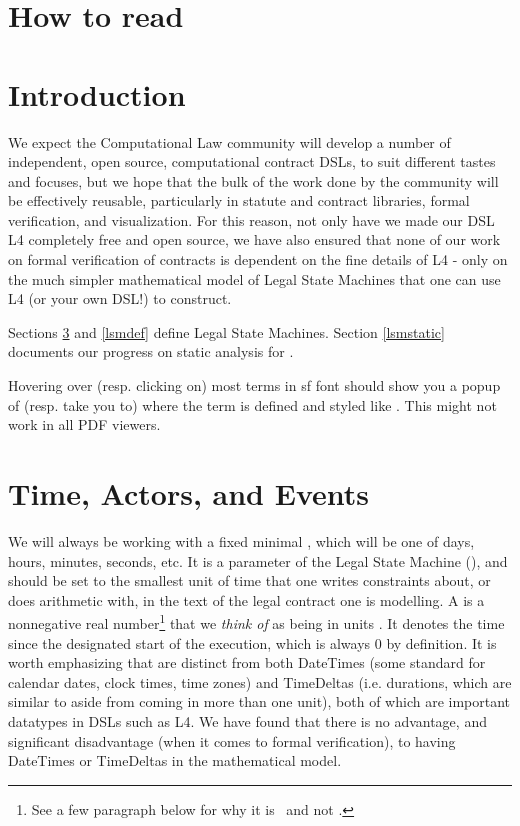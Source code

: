\documentclass[12pt]{article}
\newcommand{\term}[1]{\EM{\textsf{\hyperref[#1]{#1}}}\xspace}
\newcommand{\termz}[2]{\EM{\textsf{\hyperref[#1]{#2}}}\xspace}
\newcommand{\lsmslong}{Legal State Machines\xspace}
\newcommand{\lsm}{\texorpdfstring{\termz{lsm}{LSM}}{LSM}}
\newcommand{\lsms}{\texorpdfstring{\termz{lsm}{LSMs}}{LSMs}}
\newcommand{\timeunit}{\term{timeunit}}
\newcommand{\timestamps}{\termz{timestamp}{timestamps}}
\newcommand{\TS}{\EM{\mathbb{\hyperref[TS]{T}}}\xsapce}
\begin{document}
\section{How to read}

\section{Introduction}

We expect the Computational Law community will develop a number of independent, open source, computational contract DSLs, to suit different tastes and focuses, but we hope that the bulk of the work done by the community will be effectively reusable, particularly in statute and contract libraries, formal verification, and visualization. For this reason, not only have we made our DSL L4 completely free and open source, we have also ensured that none of our work on formal verification of contracts is dependent on the fine details of L4 - only on the much simpler mathematical model of \lsmslong that one can use L4 (or your own DSL!) to construct.

Sections \ref{basics} and \ref{lsmdef} define \lsmslong. Section \ref{lsmstatic} documents our progress on static analysis for \lsms.

Hovering over (resp. clicking on) most terms in \textsf{{sf font}} should show you a popup of (resp. take you to)  where the term is defined and styled like . This might not work in all PDF viewers.


\section{Time, Actors, and Events} \label{basics}
We will always be working with a fixed minimal , which will be one of days, hours, minutes, seconds, etc. It is a parameter of the Legal State Machine (\lsm), and should be set to the smallest unit of time that one writes constraints about, or does arithmetic with, in the text of the legal contract one is modelling.  A  is  a nonnegative real number\footnote{See a few paragraph below for why it is \RR\, and not \NN.} that we \textit{think of} as being in units \timeunit. It denotes the time since the designated start of the \lsm execution, which is always 0 by definition.
It is worth emphasizing that \timestamps are distinct from both DateTimes (some standard for calendar dates, clock times, time zones) and TimeDeltas (i.e. durations, which are similar to \timeunit aside from coming in more than one unit), both of which are important datatypes in DSLs such as L4. We have found that there is no advantage, and significant disadvantage (when it comes to formal verification), to having DateTimes or TimeDeltas in the mathematical model.
\end{document}
